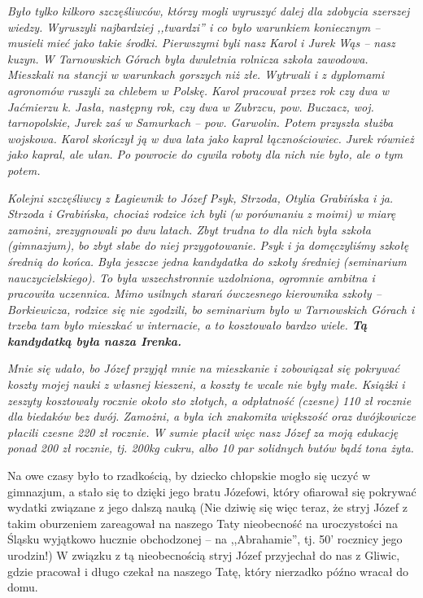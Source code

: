 \textit{Było tylko kilkoro szczęśliwców, którzy mogli wyruszyć dalej dla zdobycia szerszej wiedzy. Wyruszyli najbardziej ,,twardzi'' i co było warunkiem koniecznym -- musieli mieć jako takie środki. Pierwszymi byli nasz Karol i Jurek Wąs -- nasz kuzyn. W Tarnowskich Górach była dwuletnia rolnicza szkoła zawodowa. Mieszkali na stancji w warunkach gorszych niż złe. Wytrwali i z dyplomami agronomów ruszyli za chlebem w Polskę. Karol pracował przez rok czy dwa w Jaćmierzu k. Jasła, następny rok, czy dwa w Zubrzcu, pow. Buczacz, woj. tarnopolskie, Jurek zaś w Samurkach -- pow. Garwolin. Potem przyszła służba wojskowa. Karol skończył ją w dwa lata jako kapral łącznościowiec. Jurek również jako kapral, ale ułan. Po powrocie do cywila roboty dla nich nie było, ale o tym potem.}

\textit{Kolejni szczęśliwcy z Łagiewnik to Józef Psyk, Strzoda, Otylia Grabińska i ja. Strzoda i Grabińska, chociaż rodzice ich byli (w porównaniu z moimi) w miarę zamożni, zrezygnowali po dwu latach. Zbyt trudna to dla nich była szkoła (gimnazjum), bo zbyt słabe do niej przygotowanie. Psyk i ja domęczyliśmy szkołę średnią do końca. Była jeszcze jedna kandydatka do szkoły średniej (seminarium nauczycielskiego). To była wszechstronnie uzdolniona, ogromnie ambitna i pracowita uczennica. Mimo usilnych starań ówczesnego kierownika szkoły – Borkiewicza, rodzice się nie zgodzili, bo seminarium było w Tarnowskich Górach i trzeba tam było mieszkać w internacie, a to kosztowało bardzo wiele. \textbf{Tą kandydatką była nasza Irenka.}}

\textit{Mnie się udało, bo Józef przyjął mnie na mieszkanie i zobowiązał się pokrywać koszty mojej nauki z własnej kieszeni, a koszty te wcale nie były małe. Książki i zeszyty kosztowały rocznie około sto złotych, a odpłatność (czesne) 110 zł rocznie dla biedaków bez dwój. Zamożni, a była ich znakomita większość oraz dwójkowicze płacili czesne 220 zł rocznie. W sumie płacił więc nasz Józef za moją edukację ponad 200 zł rocznie, tj. 200kg cukru, albo 10 par solidnych butów bądź tona żyta.}


Na owe czasy było to rzadkością, by dziecko chłopskie mogło się uczyć w gimnazjum, a stało się to dzięki jego bratu Józefowi, który ofiarował się pokrywać wydatki związane z jego dalszą nauką (Nie dziwię się więc teraz, że stryj Józef z takim oburzeniem zareagował na naszego Taty nieobecność na uroczystości na Śląsku wyjątkowo hucznie obchodzonej -- na ,,Abrahamie'', tj. 50’ rocznicy jego urodzin!) W związku z tą nieobecnością stryj Józef przyjechał do nas z Gliwic, gdzie pracował i długo czekał na naszego Tatę, który nierzadko późno wracał do domu.

